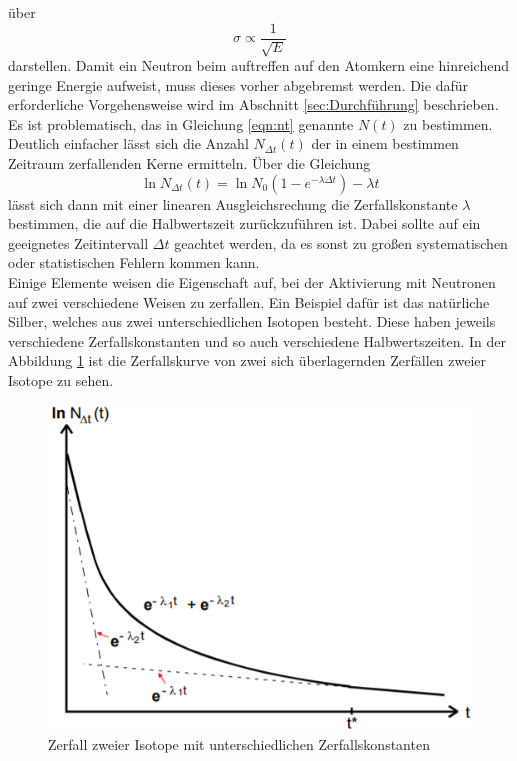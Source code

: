 über 
\begin{equation}
    \sigma \propto \frac{1}{\sqrt{E}}
\end{equation}
darstellen.
Damit ein Neutron beim auftreffen auf den Atomkern eine hinreichend geringe Energie aufweist, muss dieses vorher abgebremst werden.
Die dafür erforderliche Vorgehensweise wird im Abschnitt \ref{sec:Durchführung} beschrieben.
\\
Es ist problematisch, das in Gleichung \ref{eqn:nt} genannte $N(t)$ zu bestimmen. Deutlich einfacher lässt sich die Anzahl 
$N_{\Delta t}(t)$ der in einem bestimmen Zeitraum zerfallenden Kerne ermitteln. Über die Gleichung 
\begin{equation}
    \ln{N_{\Delta t}(t)} = \ln{N_0}(1 - e^{-\lambda\Delta t}) -\lambda t
    \label{eqn:N}
\end{equation}
lässt sich dann mit einer linearen Ausgleichsrechung die Zerfallskonstante $\lambda$ bestimmen, die auf die Halbwertszeit
zurückzuführen ist. Dabei sollte auf ein geeignetes Zeitintervall $\Delta t$ geachtet werden, da es sonst zu großen systematischen
oder statistischen Fehlern kommen kann. 
\\
Einige Elemente weisen die Eigenschaft auf, bei der Aktivierung mit Neutronen auf zwei verschiedene Weisen zu zerfallen. Ein 
Beispiel dafür ist das natürliche Silber, welches aus zwei unterschiedlichen Isotopen besteht. Diese haben jeweils verschiedene
Zerfallskonstanten und so auch verschiedene Halbwertszeiten. In der Abbildung \ref{fig:2iso} ist die Zerfallskurve von zwei
sich überlagernden Zerfällen zweier Isotope zu sehen.
\begin{figure}
    \centering
    \includegraphics[width=\textwidth]{data/zerfall.png}
    \caption{Zerfall zweier Isotope mit unterschiedlichen Zerfallskonstanten \cite{V702}}
    \label{fig:2iso}
\end{figure}
